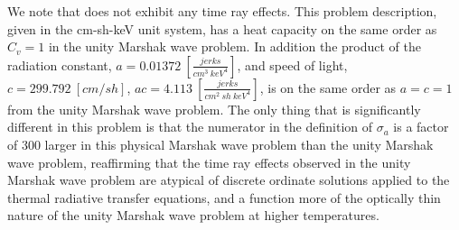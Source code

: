We note that  does not exhibit any time ray effects.  
This problem description, given in the cm-sh-keV unit system, has a heat capacity on the same order as $C_v=1$ in the unity Marshak wave problem.  
In addition the product of the radiation constant, $a = 0.01372~[\frac{jerks}{cm^3~keV^4}]$, and speed of light, $c=299.792~[cm/sh]$, $ac = 4.113~\left[\frac{jerks}{cm^2~sh~keV^4}\right]$, is on the same order as $a=c=1$ from the unity Marshak wave problem.
The only thing that is significantly different in this problem is that the numerator in the definition of $\sigma_a$ is a factor of 300 larger in this physical Marshak wave problem than the unity Marshak wave problem, reaffirming that the time ray effects observed in the unity Marshak wave problem are atypical of discrete ordinate solutions applied to the thermal radiative transfer equations, and a function more of the optically thin nature of the unity Marshak wave problem at higher temperatures.

